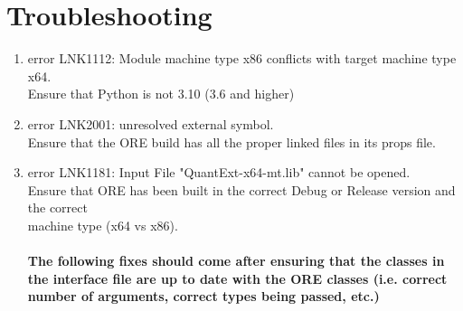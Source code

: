 \documentclass[10pt]{article}
\begin{document}
\section*{Troubleshooting}
\begin{enumerate}
    \item error LNK1112: Module machine type x86 conflicts with target machine type x64.\\
    \-\hspace{1cm}  Ensure that Python is not 3.10 (3.6 and higher)\\

    \item error LNK2001: unresolved external symbol. \\
    \-\hspace{1cm}  Ensure that the ORE build has all the proper linked files in its props file.\\

    \item error LNK1181: Input File "QuantExt-x64-mt.lib" cannot be opened. \\
    \-\hspace{1cm}  Ensure that ORE has been built in the correct Debug or Release version and the correct \\\-\hspace{1cm} machine type (x64 vs x86).\\
    \\

    \textbf{The following fixes should come after ensuring that the classes in the interface file are up to date with the ORE classes (i.e. correct number of arguments, correct types being passed, etc.)} \\


\end{enumerate}
\end{document}
